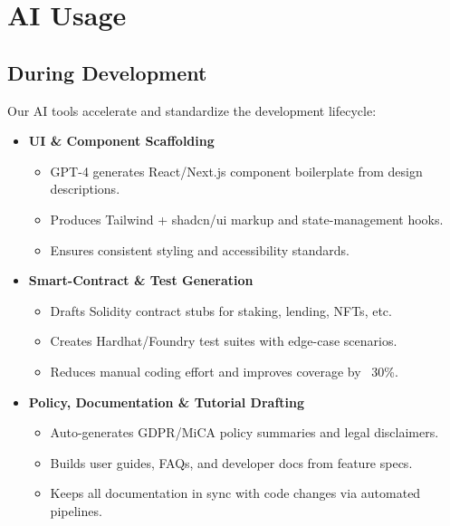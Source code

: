 \documentclass[13pt]{extarticle}
\begin{document}
\newpage
\section{AI Usage}

\subsection{During Development}
Our AI tools accelerate and standardize the development lifecycle:
\begin{itemize}[left=1em]
  \item \textbf{UI \& Component Scaffolding}
    \begin{itemize}[left=1.2em]
      \item GPT-4 generates React/Next.js component boilerplate from design descriptions.
      \item Produces Tailwind + shadcn/ui markup and state-management hooks.
      \item Ensures consistent styling and accessibility standards.
    \end{itemize}
  \item \textbf{Smart-Contract \& Test Generation}
    \begin{itemize}[left=1.2em]
      \item Drafts Solidity contract stubs for staking, lending, NFTs, etc.
      \item Creates Hardhat/Foundry test suites with edge-case scenarios.
      \item Reduces manual coding effort and improves coverage by ~30\%.
    \end{itemize}
  \item \textbf{Policy, Documentation \& Tutorial Drafting}
    \begin{itemize}[left=1.2em]
      \item Auto-generates GDPR/MiCA policy summaries and legal disclaimers.
      \item Builds user guides, FAQs, and developer docs from feature specs.
      \item Keeps all documentation in sync with code changes via automated pipelines.
    \end{itemize}
\end{itemize}
\end{document}
